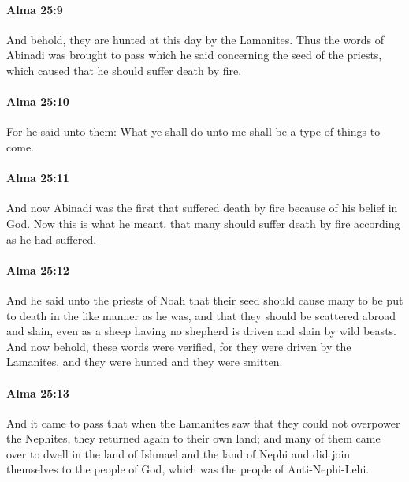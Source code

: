 		\paragraph{Alma 25:9} %
			\label{ALMA-25-9}

			And behold, they are hunted at this day by the Lamanites.
			Thus the words of Abinadi was brought to pass
			which he said concerning the seed of the priests,
			which caused that he should suffer death by fire.

		\paragraph{Alma 25:10} %
			\label{ALMA-25-10}

			For he said unto them:
			What ye shall do unto me shall be a type of things to come.

		\paragraph{Alma 25:11} %
			\label{ALMA-25-11}

			And now Abinadi was the first
			that suffered death by fire because of his belief in God.
			Now this is what he meant,
			that many should suffer death by fire according as he had suffered.

		\paragraph{Alma 25:12} %
			\label{ALMA-25-12}

			And he said unto the priests of Noah
			that their seed should cause many to be put to death in the like manner as he was,
			and that they should be scattered abroad and slain,
			even as a sheep having no shepherd is driven and slain by wild beasts.
			And now behold, these words were verified,
			for they were driven by the Lamanites,
			and they were hunted and they were smitten.

		\paragraph{Alma 25:13} %
			\label{ALMA-25-13}

			And it came to pass that
			when the Lamanites saw that they could not overpower the Nephites,
			they returned again to their own land;
			and many of them came over to dwell in the land of Ishmael and the land of Nephi
			and did join themselves to the people of God,
			which was the people of Anti-Nephi-Lehi.

